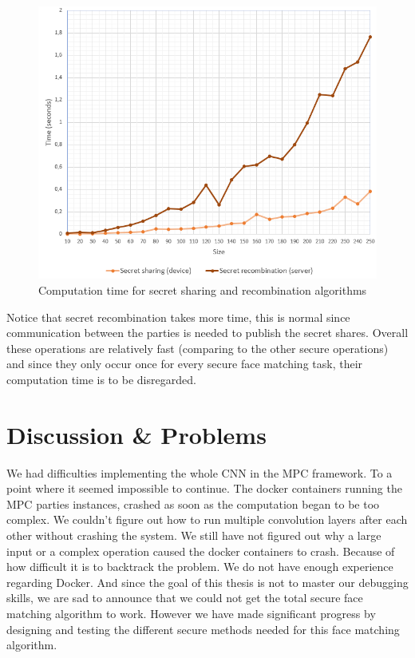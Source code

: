\begin{figure}[H]
  \includegraphics[scale=0.7]{fig/secret_test.png}
  \centering
  \caption{Computation time for secret sharing and recombination algorithms}
  \label{fig:secret_test}
\end{figure}

Notice that secret recombination takes more time, this is normal since communication between the parties is needed to publish the secret shares. Overall these operations are relatively fast (comparing to the other secure operations) and since they only occur once for every secure face matching task, their computation time is to be disregarded.

\section{Discussion \& Problems}
We had difficulties implementing the whole CNN in the MPC framework. To a point where it seemed impossible to continue. The docker containers running the MPC parties instances, crashed as soon as the computation began to be too complex. We couldn't figure out how to run multiple convolution layers after each other without crashing the system. We still have not figured out why a large input or a complex operation caused the docker containers to crash. Because of how difficult it is to backtrack the problem. We do not have enough experience regarding Docker. And since the goal of this thesis is not to master our debugging skills, we are sad to announce that we could not get the total secure face matching algorithm to work. However we have made significant progress by designing and testing the different secure methods needed for this face matching algorithm.\\

